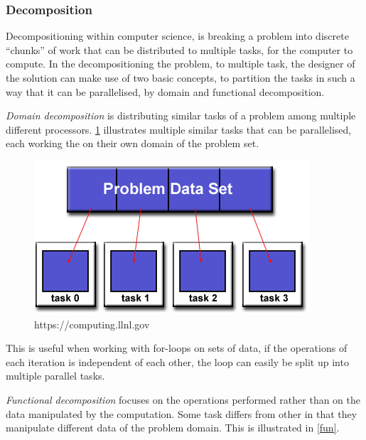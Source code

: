 \subsubsection{Decomposition}
Decompositioning within computer science, is breaking a problem into discrete \enquote{chunks} of work that can be distributed to multiple tasks, for the computer to compute. In the decompositioning the problem, to multiple task, the designer of the solution can make use of two basic concepts, to partition the tasks in such a way that it can be parallelised, by domain and functional decomposition.

\emph{Domain decomposition} is distributing similar tasks of a problem among multiple different processors. \cref{dom} illustrates multiple similar tasks that can be parallelised, each working the on their own domain of the problem set.

\begin{figure}[htbp]\label{dom}
\includegraphics[width=\textwidth]{Analysis/Supercomputing/domain_decomp.png}
\caption{https://computing.llnl.gov}
\end{figure}

This is useful when working with for-loops on sets of data, if the operations of each iteration is independent of each other, the loop can easily be split up into multiple parallel tasks.

\emph{Functional decomposition} focuses on the operations performed rather than on the data manipulated by the computation. Some task differs from other in that they manipulate different data of the problem domain. This is illustrated in \cref{fun}.

